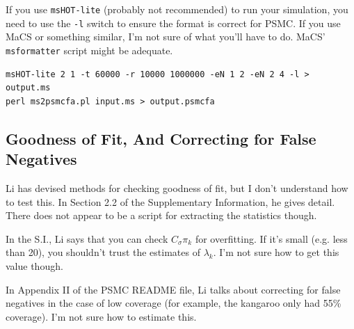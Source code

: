 \documentclass[11pt,a4paper]{article}
\begin{document}
If you use \texttt{msHOT-lite} (probably not recommended) to run your simulation, you need to use the \texttt{-l} switch to ensure the format is correct for PSMC. If you use MaCS or something similar, I'm not sure of what you'll have to do. MaCS' \texttt{msformatter} script might be adequate.

\begin{lstlisting}
msHOT-lite 2 1 -t 60000 -r 10000 1000000 -eN 1 2 -eN 2 4 -l > output.ms
perl ms2psmcfa.pl input.ms > output.psmcfa
\end{lstlisting}

\subsection{Goodness of Fit, And Correcting for False Negatives}
Li \cite{li2011inference} has devised methods for checking goodness of fit, but I don't understand how to test this. In Section 2.2 of the Supplementary Information, he gives detail. There does not appear to be a script for extracting the statistics though.

In the S.I., Li says that you can check $C_\sigma\pi_k$ for overfitting. If it's small (e.g. less than 20), you shouldn't trust the estimates of $\lambda_k$. I'm not sure how to get this value though.

In Appendix II of the PSMC README file, Li talks about correcting for false negatives in the case of low coverage (for example, the kangaroo only had 55\% coverage). I'm not sure how to estimate this.
\end{document}

